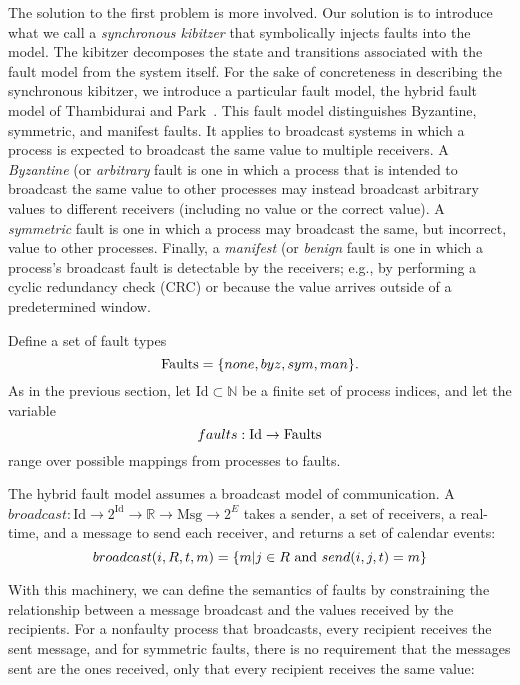 \documentclass{llncs/llncs}
\newcommand{\Id}{\ensuremath{\mathrm{Id}}\xspace}
\newcommand{\Msg}{\ensuremath{\mathrm{Msg}}\xspace}
\begin{document}
The solution to the first problem is more involved. Our solution is to introduce what we call a \emph{synchronous kibitzer} that symbolically injects faults into the model. The kibitzer decomposes the state and transitions associated with the fault model from the system itself. For the sake of concreteness in describing the synchronous kibitzer, we introduce a particular fault model, the hybrid fault model of Thambidurai and Park~\cite{hybrid}. This fault model distinguishes Byzantine, symmetric, and manifest faults. It  applies to broadcast systems in which a process is expected to broadcast the same value to multiple receivers. A \emph{Byzantine} (or \emph{arbitrary} fault is one in which a process that is intended to broadcast the same value to other processes may instead broadcast arbitrary values to different receivers (including no value or the correct value). A \emph{symmetric} fault is one in which a process may broadcast the same, but incorrect, value to other processes. Finally, a \emph{manifest} (or \emph{benign} fault is one in which a process's broadcast fault is detectable by the receivers; e.g., by performing a cyclic redundancy check (CRC) or because the value arrives outside of a predetermined window.


Define a set of fault types $$\textnormal{Faults} = \{none, byz, sym, man\}.$$ As in the previous section, let $\Id \subset \mathbb{N}$ be a finite set of process indices, and let the variable $$faults: \Id \rightarrow \textnormal{Faults}$$ range over possible mappings from processes to faults.

The hybrid fault model assumes a broadcast model of communication.
A $broadcast: \Id \rightarrow 2^{\Id} \rightarrow \mathbb{R} \rightarrow \Msg \rightarrow 2^{E}$ takes a sender, a set of receivers, a real-time, and a message to send each receiver, and returns a set of calendar events:
$$broadcast(i, R, t, m) = \{m | j \in R \textnormal{ and } send(i, j, t) = m\}$$

With this machinery, we can define the semantics of faults by constraining the relationship between a message broadcast and the values received by the recipients. For a nonfaulty process that broadcasts, every recipient receives the sent message, and for symmetric faults, there is no requirement that the messages sent are the ones received, only that every recipient receives the same value:
\noindent
\end{document}
